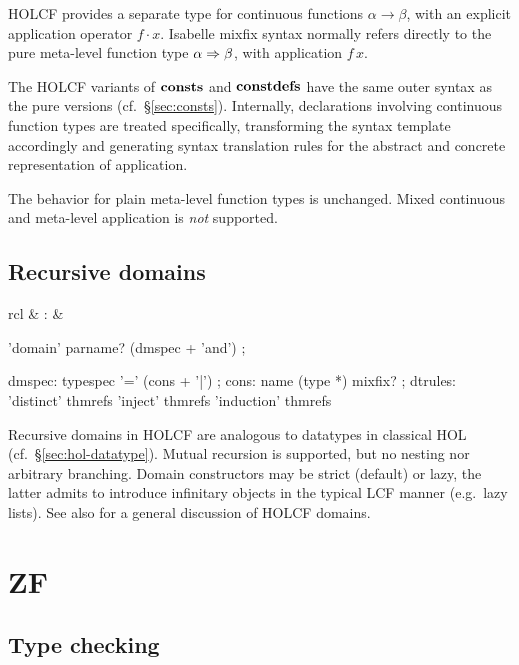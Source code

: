 HOLCF provides a separate type for continuous functions $\alpha \to
\beta$, with an explicit application operator $f \cdot x$.  Isabelle mixfix
syntax normally refers directly to the pure meta-level function type $\alpha
\Rightarrow \beta$, with application $f\,x$.

The HOLCF variants of ${\mathord{\mathbf{consts}}}$ and ${\mathord{\mathbf{constdefs}}}$ have the same outer syntax as
the pure versions (cf.\ \S\ref{sec:consts}).  Internally, declarations
involving continuous function types are treated specifically, transforming the
syntax template accordingly and generating syntax translation rules for the
abstract and concrete representation of application.

The behavior for plain meta-level function types is unchanged.  Mixed
continuous and meta-level application is \emph{not} supported.

\subsection{Recursive domains}

\begin{matharray}{rcl}
   & : &  \\
\end{matharray}

\begin{rail}
  'domain' parname? (dmspec + 'and')
  ;

  dmspec: typespec '=' (cons + '|')
  ;
  cons: name (type *) mixfix?
  ;
  dtrules: 'distinct' thmrefs 'inject' thmrefs 'induction' thmrefs
\end{rail}

Recursive domains in HOLCF are analogous to datatypes in classical HOL (cf.\ 
\S\ref{sec:hol-datatype}).  Mutual recursion is supported, but no nesting nor
arbitrary branching.  Domain constructors may be strict (default) or lazy, the
latter admits to introduce infinitary objects in the typical LCF manner (e.g.\ 
lazy lists).  See also \cite{MuellerNvOS99} for a general discussion of HOLCF
domains.


\section{ZF}

\subsection{Type checking}

